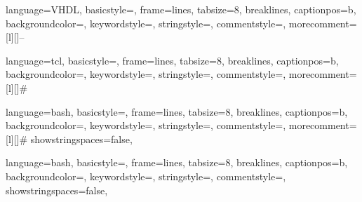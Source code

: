 

 {
    language=VHDL,
    basicstyle=\scriptsize\ttfamily,
    frame=lines,
    tabsize=8,
    breaklines,
    captionpos=b,
    backgroundcolor=\color{lightgray},
    keywordstyle=\color{blue},
    stringstyle=\color{orange},
    commentstyle=\color{gray},
    morecomment=[l][\color{gray}]{--}
}

 {
    language=tcl,
    basicstyle=\scriptsize\ttfamily,
    frame=lines,
    tabsize=8,
    breaklines,
    captionpos=b,
    backgroundcolor=\color{lightgray},
    keywordstyle=\color{blue},
    stringstyle=\color{orange},
    commentstyle=\color{gray},
    morecomment=[l][\color{gray}]{\#}
}

 {
    language=bash,
    basicstyle=\scriptsize\ttfamily,
    frame=lines,
    tabsize=8,
    breaklines,
    captionpos=b,
    backgroundcolor=\color{lightgray},
    keywordstyle=\color{blue},
    stringstyle=\color{orange},
    commentstyle=\color{gray},
    morecomment=[l][\color{gray}]{\#}
    showstringspaces=false,
}

 {
    language=bash,
    basicstyle=\scriptsize\ttfamily\color{white},
    frame=lines,
    tabsize=8,
    breaklines,
    captionpos=b,
    backgroundcolor=\color{black},
    keywordstyle=\color{cyan},
    stringstyle=\color{orange},
    commentstyle=\color{green},
    showstringspaces=false,
}